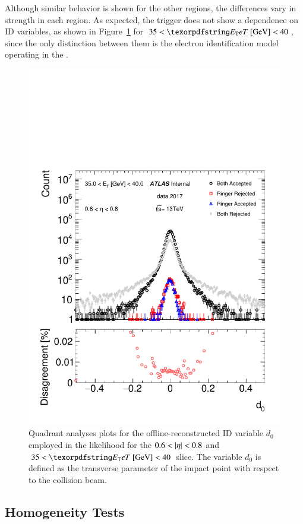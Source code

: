 Although similar behavior is shown for the other 
regions, the differences vary in strength in each \abseta{} region. As expected, 
the trigger does not show a dependence on ID variables, as shown in Figure~\ref{fig:quadrant_track_variables_30GeV} for $35<\et{}~[\text{GeV}]<40$, since the only distinction between them is the electron identification model operating in the \fastcalo{}.


\begin{figure}[h!tb]
\centering
\includegraphics[width=.5\textwidth]{sections/05_analysis/figures/quadrant_plots/d0.pdf}

\caption{\label{fig:quadrant_track_variables_30GeV}
Quadrant analyses plots for the offline-reconstructed ID variable $d_0$ employed in the
likelihood for the $0.6<\abseta{}<0.8$ and $35<\et{}~[\text{GeV}]<40$ slice. The variable $d_0$ is defined as the transverse parameter of the impact point with respect to the collision beam.
}
\end{figure}






\FloatBarrier
\subsection[Homogeneity Tests]{Homogeneity Tests}\label{ssec:agreement}

